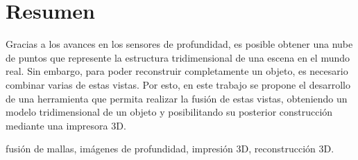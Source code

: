 \documentclass{pfc}
\subtitle{Informe final}
\newcommand{\TODO}[1]{{\color{red}\bfseries#1}}
\begin{document}
\frontmatter
	\maketitle
	\chapter{Resumen}
		Gracias a los avances en los sensores de profundidad,
		es posible obtener una nube de puntos que represente la estructura tridimensional de una escena en el mundo real.
		Sin embargo, para poder reconstruir completamente un objeto, es necesario combinar varias de estas vistas.
		Por esto, en este trabajo se propone el desarrollo de una herramienta
		que permita realizar la fusión de estas vistas,
		obteniendo un modelo tridimensional de un objeto
		y posibilitando su posterior construcción mediante una impresora 3D.

		 fusión de mallas, imágenes de profundidad, impresión 3D, reconstrucción 3D.
	\tableofcontents
\mainmatter
	
	
	
	
	

	
	
\end{document}
